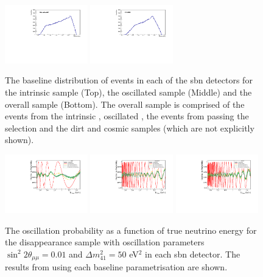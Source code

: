 \begin{figure}[!h]
    \includegraphics[width = 0.32\textwidth]{figures-chap5/MicroBooNE_nue.pdf}
    \includegraphics[width = 0.32\textwidth]{figures-chap5/ICARUS_nue.pdf}
    \caption[\nue baseline distributions.]{The baseline distribution of events in each of the \gls{sbn} detectors for the intrinsic \nue sample (Top), the oscillated \nue sample (Middle) and the overall \nue sample (Bottom). The overall sample is comprised of the events from the intrinsic \nue, oscillated \nue, the \numu events from  passing the \nue selection and the dirt and cosmic samples (which are not explicitly shown).}
    \label{fig:nue_baseline_dist}
\end{figure}

\begin{figure}[!h]
    \centering
    \includegraphics[width = 0.32\textwidth]{figures-chap5/osc_prob_sbnd.pdf}
    \includegraphics[width = 0.32\textwidth]{figures-chap5/osc_prob_uboone.pdf}
    \includegraphics[width = 0.32\textwidth]{figures-chap5/osc_prob_icarus.pdf}
    \caption[Oscillation probability for different baseline parametrisations.]{The oscillation probability as a function of true neutrino energy for the \numu disappearance sample with oscillation parameters $\sin^2{2\theta_{\mu\mu}} = 0.01$ and $\Delta m^2_{41} = 50$ eV$^2$ in each \gls{sbn} detector. The results from using each baseline parametrisation are shown.}
    \label{fig:baseline_osc_probability}
\end{figure}

